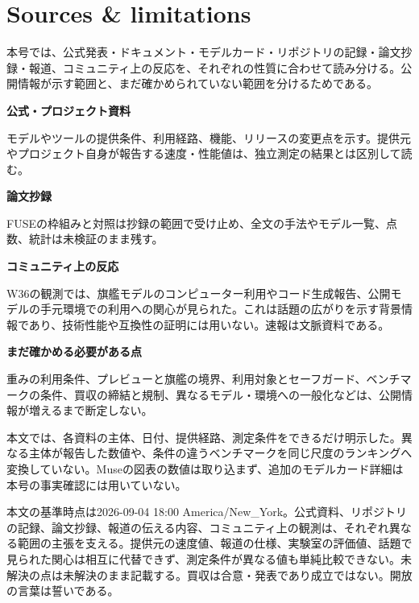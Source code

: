 \section*{Sources \& limitations}

本号では、公式発表・ドキュメント・モデルカード・リポジトリの記録・論文抄録・報道、コミュニティ上の反応を、それぞれの性質に合わせて読み分ける。公開情報が示す範囲と、まだ確かめられていない範囲を分けるためである。

\begin{tcolorbox}[enhanced,breakable,colback=SurveySoft,colframe=SurveyRule,boxrule=0.4pt,arc=1mm,left=3mm,right=3mm,top=2mm,bottom=2mm]
\textbf{公式・プロジェクト資料}\par
モデルやツールの提供条件、利用経路、機能、リリースの変更点を示す。提供元やプロジェクト自身が報告する速度・性能値は、独立測定の結果とは区別して読む。\par\smallskip
\textbf{論文抄録}\par
FUSEの枠組みと対照は抄録の範囲で受け止め、全文の手法やモデル一覧、点数、統計は未検証のまま残す。\par\smallskip
\textbf{コミュニティ上の反応}\par
W36の観測では、旗艦モデルのコンピューター利用やコード生成報告、公開モデルの手元環境での利用への関心が見られた。これは話題の広がりを示す背景情報であり、技術性能や互換性の証明には用いない。速報は文脈資料である。\par\smallskip
\textbf{まだ確かめる必要がある点}\par
重みの利用条件、プレビューと旗艦の境界、利用対象とセーフガード、ベンチマークの条件、買収の締結と規制、異なるモデル・環境への一般化などは、公開情報が増えるまで断定しない。
\end{tcolorbox}

本文では、各資料の主体、日付、提供経路、測定条件をできるだけ明示した。異なる主体が報告した数値や、条件の違うベンチマークを同じ尺度のランキングへ変換していない。Museの図表の数値は取り込まず、追加のモデルカード詳細は本号の事実確認には用いていない。

\nocite{astrasafety,astrapath,astralaunch,fuse,w36community,fermatscience,fermatgithub,k2horizon,glm53weights,fablemythos,gemini38flash,musespark,copilotharness,kilojetbrains,nvidiahf,atlas,pics,h3max}

\begin{claimboundary}
本文の基準時点は2026-09-04 18:00 America/New\_York。公式資料、リポジトリの記録、論文抄録、報道の伝える内容、コミュニティ上の観測は、それぞれ異なる範囲の主張を支える。提供元の速度値、報道の仕様、実験室の評価値、話題で見られた関心は相互に代替できず、測定条件が異なる値も単純比較できない。未解決の点は未解決のまま記載する。買収は合意・発表であり成立ではない。開放の言葉は誓いである。
\end{claimboundary}
